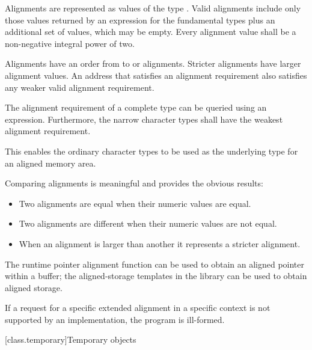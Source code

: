 \pnum
Alignments are represented as values of the type .
Valid alignments include only those values returned by an 
expression for the fundamental types plus an additional 
set of values, which may be empty.
Every alignment value shall be a non-negative integral power of two.

\pnum
Alignments have an order from  to
 or  alignments. Stricter
alignments have larger alignment values. An address that satisfies an alignment
requirement also satisfies any weaker valid alignment requirement.

\pnum
The alignment requirement of a complete type can be queried using an
 expression. Furthermore,
the narrow character types shall have the weakest
alignment requirement.
\begin{note}
This enables the ordinary character types to be used as the
underlying type for an aligned memory area.
\end{note}

\pnum
Comparing alignments is meaningful and provides the obvious results:

\begin{itemize}
\item Two alignments are equal when their numeric values are equal.
\item Two alignments are different when their numeric values are not equal.
\item When an alignment is larger than another it represents a stricter alignment.
\end{itemize}

\pnum
\begin{note}
The runtime pointer alignment function
can be used to obtain an aligned pointer within a buffer; the aligned-storage templates
in the library can be used to obtain aligned storage.
\end{note}

\pnum
If a request for a specific extended alignment in a specific context is not
supported by an implementation, the program is ill-formed.

[class.temporary]{Temporary objects}

